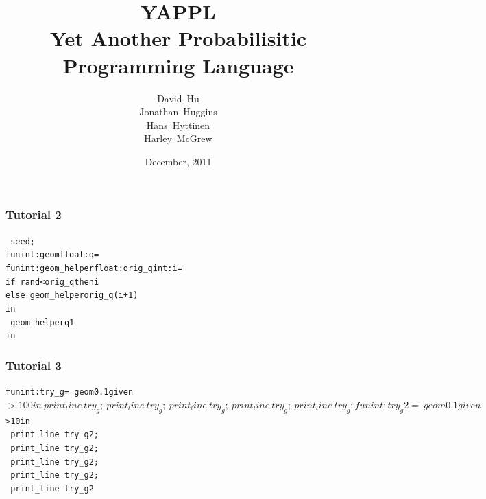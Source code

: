 \documentclass[xcolor=dvipsnames]{beamer}
\title[YAPPL] 
{
  YAPPL\\
  Yet Another Probabilisitic\\ Programming Language \\
}
\author[Hu, Huggins, Hyttinen, \& McGrew]
{
  David~Hu\\
  Jonathan~Huggins\\
  Hans~Hyttinen\\
  Harley~McGrew\\
}
\institute[Columbia University]
{
  Columbia University
}
\date[December, 2011]
{December, 2011}
\begin{document}
\begin{frame}
  \titlepage
\end{frame}






\begin{frame}[fragile]
\frametitle{Tutorial 2}
\begin{alltt}
~seed;
fun int:geom float:q =
  fun int:geom_helper float:orig_q int:i =
    if ~rand < orig_q then i
    else ~geom_helper orig_q (i+1)
  in 
    ~geom_helper q 1
in
\end{alltt}
\end{frame}

\begin{frame}[fragile]
\frametitle{Tutorial 3}
\begin{alltt}
fun int:try_g = ~geom 0.1 given $ > 100 in
~print_line ~try_g;
~print_line ~try_g;
~print_line ~try_g;
~print_line ~try_g;
~print_line ~try_g;

fun int:try_g2 = ~geom 0.1 given $ > 10 in
~print_line ~try_g2;
~print_line ~try_g2;
~print_line ~try_g2;
~print_line ~try_g2;
~print_line ~try_g2
\end{alltt}
\end{frame}
\end{document}

